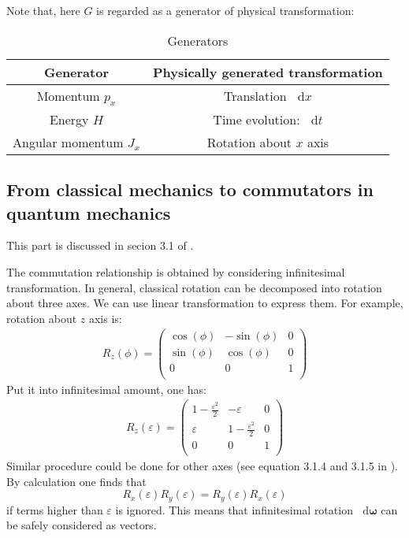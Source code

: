 \documentclass{article}
\newcommand*\diff{\mathop{}\!\mathrm{d}}
\numberwithin{equation}{subsection} %
\theoremstyle{definition}
\begin{document}
Note that, here $G$ is regarded as a generator of physical transformation:
\begin{table}[H]
    \centering
    \caption{Generators}
    \begin{tabular}{|c|c|}
    \hline
    Generator                     & Physically generated transformation \\
    \hline
    Momentum $p_x$                & Translation $\diff x$ \\
    \hline
    Energy $H$                    & Time evolution: $\diff t$ \\
    \hline
    Angular momentum $J_x$ & Rotation about $x$ axis \\
    \hline
    \end{tabular}
\end{table}
\subsection{From classical mechanics to commutators in quantum mechanics}
\label{sec:From-classical-mechanic-to-commutators}

This part is discussed in secion 3.1 of \cite{sakurai}.

The commutation relationship is obtained by considering infinitesimal
transformation. In general, classical rotation can be decomposed into
rotation about three axes. We can use linear transformation to express
them. For example, rotation about $z$ axis is:
\begin{align}
    R_z(\phi) = \left( \begin{array}{ccc}
         \cos (\phi ) & -\sin (\phi ) & 0 \\
         \sin (\phi ) & \cos (\phi ) & 0 \\
         0 & 0 & 1 \\ \end{array} \right)
\end{align}
Put it into infinitesimal amount, one has:
\begin{align} 
    R_z(\varepsilon)=\left( \begin{array}{ccc}
     1-\frac{\varepsilon ^2}{2} & -\varepsilon               & 0 \\
     \varepsilon                & 1-\frac{\varepsilon ^2}{2} & 0 \\
     0                          & 0                          & 1 \\
\end{array} \right) \end{align}
Similar procedure could be done for other axes (see equation 3.1.4 and
3.1.5 in \cite{sakurai}). By calculation one finds that
$$ R_x(\varepsilon)R_y(\varepsilon)=R_y(\varepsilon)R_x(\varepsilon)$$
if terms higher than $\varepsilon$ is ignored. This means that
infinitesimal rotation $\diff \mathbf{\omega}$ can be safely considered as
vectors.
\end{document}
